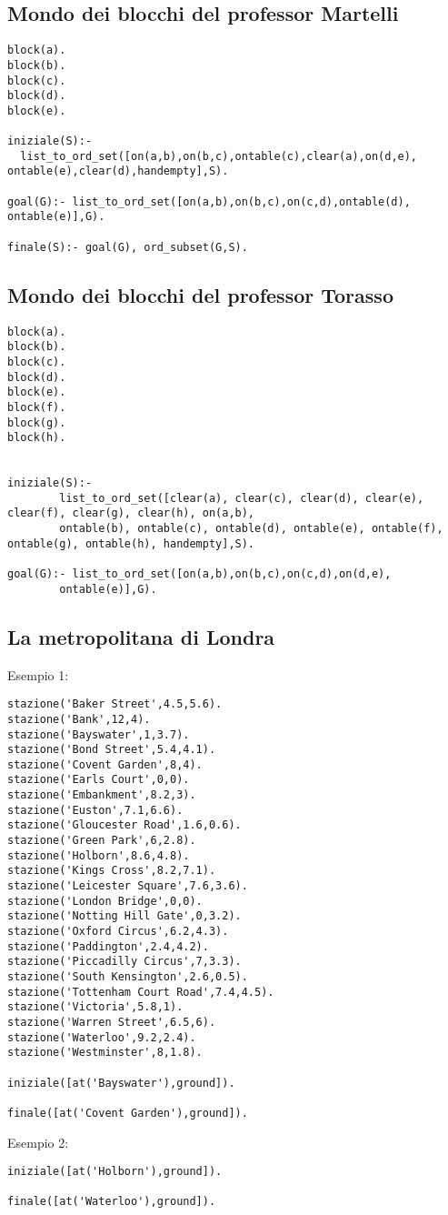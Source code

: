 \subsection{Mondo dei blocchi del professor Martelli}

\begin{lstlisting}
block(a).
block(b).
block(c).
block(d).
block(e).

iniziale(S):-
  list_to_ord_set([on(a,b),on(b,c),ontable(c),clear(a),on(d,e), ontable(e),clear(d),handempty],S).

goal(G):- list_to_ord_set([on(a,b),on(b,c),on(c,d),ontable(d), ontable(e)],G).

finale(S):- goal(G), ord_subset(G,S).
\end{lstlisting}

\subsection{Mondo dei blocchi del professor Torasso}

\begin{lstlisting}
block(a).
block(b).
block(c).
block(d).
block(e).
block(f).
block(g).
block(h).


iniziale(S):-
        list_to_ord_set([clear(a), clear(c), clear(d), clear(e), clear(f), clear(g), clear(h), on(a,b),
        ontable(b), ontable(c), ontable(d), ontable(e), ontable(f), ontable(g), ontable(h), handempty],S).

goal(G):- list_to_ord_set([on(a,b),on(b,c),on(c,d),on(d,e),
        ontable(e)],G).
\end{lstlisting}

\subsection{La metropolitana di Londra}

Esempio 1:

\begin{lstlisting}
stazione('Baker Street',4.5,5.6).
stazione('Bank',12,4).
stazione('Bayswater',1,3.7).
stazione('Bond Street',5.4,4.1).
stazione('Covent Garden',8,4).
stazione('Earls Court',0,0).
stazione('Embankment',8.2,3).
stazione('Euston',7.1,6.6).
stazione('Gloucester Road',1.6,0.6).
stazione('Green Park',6,2.8).
stazione('Holborn',8.6,4.8).
stazione('Kings Cross',8.2,7.1).
stazione('Leicester Square',7.6,3.6).
stazione('London Bridge',0,0).
stazione('Notting Hill Gate',0,3.2).
stazione('Oxford Circus',6.2,4.3).
stazione('Paddington',2.4,4.2).
stazione('Piccadilly Circus',7,3.3).
stazione('South Kensington',2.6,0.5).
stazione('Tottenham Court Road',7.4,4.5).
stazione('Victoria',5.8,1).
stazione('Warren Street',6.5,6).
stazione('Waterloo',9.2,2.4).
stazione('Westminster',8,1.8).

iniziale([at('Bayswater'),ground]).

finale([at('Covent Garden'),ground]).
\end{lstlisting}

Esempio 2:

\begin{lstlisting}
iniziale([at('Holborn'),ground]).

finale([at('Waterloo'),ground]).
\end{lstlisting}